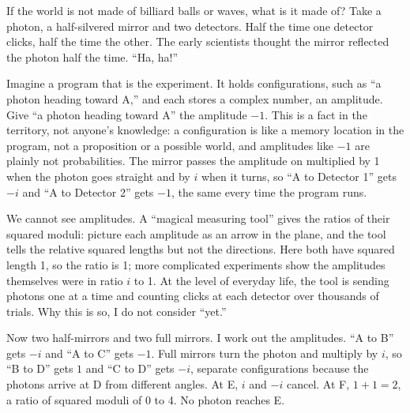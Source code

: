 
If the world is not made of billiard balls or waves, what is it made of? Take a photon, a half-silvered mirror and two detectors. Half the time one detector clicks, half the time the other. The early scientists thought the mirror reflected the photon half the time. ``Ha, ha!'' 

Imagine a program that is the experiment. It holds configurations, such as ``a photon heading toward A,'' and each stores a complex number, an amplitude. Give ``a photon heading toward A'' the amplitude $-1$. This is a fact in the territory, not anyone's knowledge: a configuration is like a memory location in the program, not a proposition or a possible world, and amplitudes like $-1$ are plainly not probabilities. The mirror passes the amplitude on multiplied by 1 when the photon goes straight and by $i$ when it turns, so ``A to Detector 1'' gets $-i$ and ``A to Detector 2'' gets $-1$, the same every time the program runs. 

We cannot see amplitudes. A ``magical measuring tool'' gives the ratios of their squared moduli: picture each amplitude as an arrow in the plane, and the tool tells the relative squared lengths but not the directions. Here both have squared length 1, so the ratio is 1; more complicated experiments show the amplitudes themselves were in ratio $i$ to 1. At the level of everyday life, the tool is sending photons one at a time and counting clicks at each detector over thousands of trials. Why this is so, I do not consider ``yet.'' 

Now two half-mirrors and two full mirrors. I work out the amplitudes. ``A to B'' gets $-i$ and ``A to C'' gets $-1$. Full mirrors turn the photon and multiply by $i$, so ``B to D'' gets $1$ and ``C to D'' gets $-i$, separate configurations because the photons arrive at D from different angles. At E, $i$ and $-i$ cancel. At F, $1+1=2$, a ratio of squared moduli of 0 to 4. No photon reaches E. 

